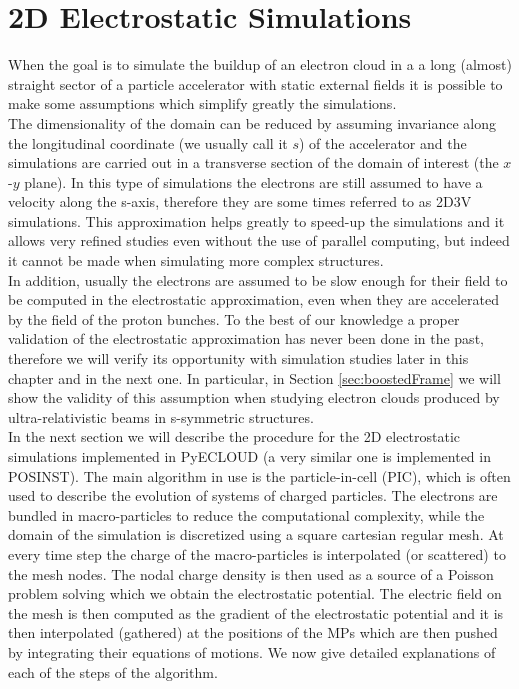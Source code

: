 \section{2D Electrostatic Simulations}
When the goal is to simulate the buildup of an electron cloud in a a long (almost) straight sector of a particle accelerator with static external fields it is possible to make some assumptions which simplify greatly the simulations.\\
The dimensionality of the domain can be reduced by assuming invariance along the longitudinal coordinate (we usually call it $s$) of the accelerator and the simulations are carried out in a transverse section of the domain of interest (the $x$-$y$ plane). In this type of simulations the electrons are still assumed to have a velocity along the s-axis, therefore they are some times referred to as 2D3V simulations. This approximation helps greatly to speed-up the simulations and it allows very refined studies even without the use of parallel computing, but indeed it cannot be made when simulating more complex structures. \\
In addition, usually the electrons are assumed to be slow enough for their field to be computed in the electrostatic approximation, even when they are accelerated by the field of the proton bunches. To the best of our knowledge a proper validation of the electrostatic approximation has never been done in the past, therefore we will verify its opportunity with simulation studies later in this chapter and in the next one. In particular, in Section \ref{sec:boostedFrame} we will show the validity of this assumption when studying electron clouds produced by ultra-relativistic beams in s-symmetric structures.\\
In the next section we will describe the procedure for the 2D electrostatic simulations implemented in PyECLOUD (a very similar one is implemented in POSINST).
The main algorithm in use is the particle-in-cell (PIC), which is often used to describe the evolution of systems of charged particles. The electrons are bundled in macro-particles to reduce the computational complexity, while the domain of the simulation is discretized using a square cartesian regular mesh. At every time step the charge of the macro-particles is interpolated (or scattered) to the mesh nodes. The nodal charge density is then used as a source of a Poisson problem solving which we obtain the electrostatic potential. The electric field on the mesh is then computed as the gradient of the electrostatic potential and it is then interpolated (gathered) at the positions of the MPs which are then pushed by integrating their equations of motions. We now give detailed explanations of each of the steps of the algorithm.
